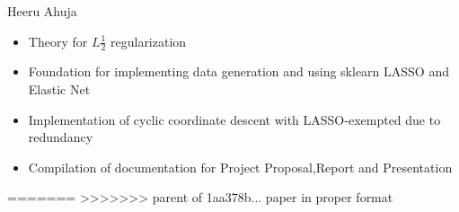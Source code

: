 \documentclass[11pt]{article}
\begin{document}
Heeru Ahuja
\begin{itemize}
	\item Theory for $L\frac{1}{2}$ regularization
	\item Foundation for implementing data generation and using sklearn LASSO and Elastic Net
	\item Implementation of cyclic coordinate descent with LASSO-exempted due to redundancy
	\item Compilation of documentation for Project Proposal,Report and Presentation
\end{itemize}

=======
>>>>>>> parent of 1aa378b... paper in proper format
\end{document}
